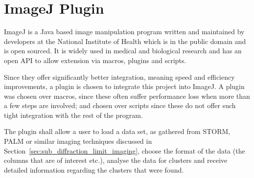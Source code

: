 
\part{ImageJ Plugin}
\label{prt:imagej_plugin}

ImageJ is a Java based image manipulation program written and maintained by
developers at the National Institute of Health which is in the public domain
and is open sourced. It is widely used in medical and biological research and
has an open API to allow extension via macros, plugins and scripts.

Since they offer significantly better integration, meaning speed and efficiency
improvements, a plugin is chosen to integrate this project into ImageJ. A
plugin was chosen over macros, since these often suffer performance loss when
more than a few steps are involved; and chosen over scripts since these do not
offer such tight integration with the rest of the program.

The plugin shall allow a user to load a data set, as gathered from STORM, PALM
or similar imaging techniques discussed in
Section~\ref{sec:sub_diffraction_limit_imaging}, choose the format of the data
(the columns that are of interest etc.), analyse the data for clusters and
receive detailed information regarding the clusters that were found.
